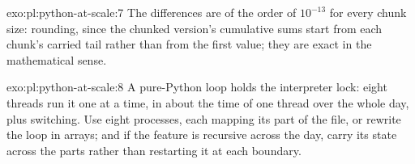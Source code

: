 \begin{solution}{exo:pl:python-at-scale:7}
The differences are of the order of $10^{-13}$ for every chunk size: rounding, since the chunked version's cumulative sums start from
each chunk's carried tail rather than from the first value; they are exact in the mathematical sense.
\end{solution}

\begin{solution}{exo:pl:python-at-scale:8}
A pure-Python loop holds the interpreter lock: eight threads run it one at a time, in about the time of one thread over the whole day,
plus switching. Use eight processes, each mapping its part of the file, or rewrite the loop in arrays; and if the feature is recursive
across the day, carry its state across the parts rather than restarting it at each boundary.
\end{solution}

